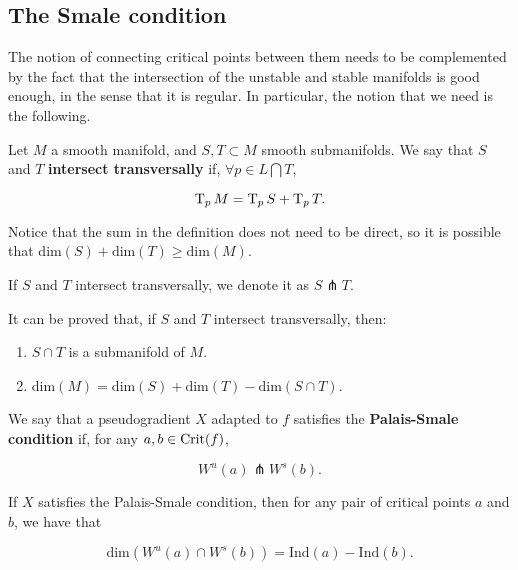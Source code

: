 \subsection{The Smale condition}

The notion of connecting critical points between them needs to be complemented by the fact that the intersection of the unstable and stable manifolds is good enough, in the sense that it is regular. In particular, the notion that we need is the following.

\begin{deff}
Let $M$ a smooth manifold, and $S, T \subset M$ smooth submanifolds. We say that $S$ and $T$ {\bf intersect transversally} if, $\forall p \in L \bigcap T$,

$$\operatorname T_pM = \operatorname T_pS + \operatorname T_pT .$$

Notice that the sum in the definition does not need to be direct, so it is possible that $\text{dim}(S)+\text{dim}(T) \geq \text{dim}(M)$.

If $S$ and $T$ intersect transversally, we denote it as $S \pitchfork T$.
\end{deff}

It can be proved that, if $S$ and $T$ intersect transversally, then:

\begin{enumerate}
	\item $S \cap T$ is a submanifold of $M$.
	\item $\text{dim}(M) = \text{dim}(S) + \text{dim}(T) - \text{dim}(S \cap T)$.
\end{enumerate}

\begin{deff}
We say that a pseudogradient $X$ adapted to $f$ satisfies the {\bf Palais-Smale condition} if, for any $a,b \in \text{Crit}(f)$,

$$W^u(a) \pitchfork W^s(b) .$$
\end{deff}

\begin{rmrk}
If $X$ satisfies the Palais-Smale condition, then for any pair of critical points $a$ and $b$, we have that

\begin{equation} \label{eq:dimIntersect}
\text{dim}(W^u(a) \cap W^s(b)) = \text{Ind}(a) - \text{Ind}(b) .
\end{equation}
\end{rmrk}


